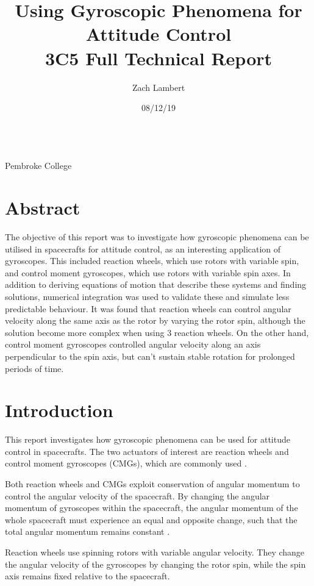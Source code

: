 \documentclass[12]{article}
\title{Using Gyroscopic Phenomena for Attitude Control \\ 3C5 Full Technical Report}
\author{Zach Lambert}
\date{08/12/19}
\begin{document}
\begin{centering}
\huge{\@title}

\large{
\@author \\
Pembroke College \\
\@date
}

\end{centering}

\begin{multicols*}{2}

\section{Abstract}

The objective of this report was to investigate how gyroscopic phenomena can be utilised in spacecrafts for attitude control, as an interesting application of gyroscopes. This included reaction wheels, which use rotors with variable spin, and control moment gyroscopes, which use rotors with variable spin axes. In addition to deriving equations of motion that describe these systems and finding solutions, numerical integration was used to validate these and simulate less predictable behaviour. It was found that reaction wheels can control angular velocity along the same axis as the rotor by varying the rotor spin, although the solution become more complex when using 3 reaction wheels. On the other hand, control moment gyroscopes controlled angular velocity along an axis perpendicular to the spin axis, but can't sustain stable rotation for prolonged periods of time.

\section{Introduction}

This report investigates how gyroscopic phenomena can be used for attitude control in spacecrafts. The two actuators of interest are reaction wheels and control moment gyroscopes (CMGs), which are commonly used \cite{reaction_wheels} \cite{hubble}.

Both reaction wheels and CMGs exploit conservation of angular momentum to control the angular velocity of the spacecraft. By changing the angular momentum of gyroscopes within the spacecraft, the angular momentum of the whole spacecraft must experience an equal and opposite change, such that the total angular momentum remains constant \cite{device_explanation}.

Reaction wheels use spinning rotors with variable angular velocity. They change the angular velocity of the gyroscopes by changing the rotor spin, while the spin axis remains fixed relative to the spacecraft. 


\end{multicols*}
\end{document}
